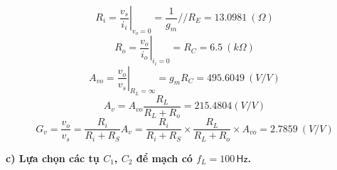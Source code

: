 \begin{equation*}
    R_{i} = \left. \frac{v_s}{i_i} \right|_{v_o=0} = \frac{1}{g_m}//R_E = 13.0981\ (\Omega)
\end{equation*}
\begin{equation*}
    R_o = \left. \frac{v_o}{i_o} \right|_{i_i=0} = R_C = 6.5\ (k\Omega)
\end{equation*}
\begin{equation*}
    A_{vo} = \left. \frac{v_o}{v_s} \right|_{R_L = \infty} = g_m R_C = 495.6049\ (V/V)
\end{equation*}
\begin{equation*}
    A_{v} = A_{vo}\dfrac{R_L}{R_L + R_o} = 215.4804 (V/V)
\end{equation*}
\begin{equation*}
    G_v = \frac{v_o}{v_s} = \frac{R_i}{R_i+R_S}A_v = \frac{R_i}{R_i+R_S}\times\frac{R_L}{R_L+R_o}\times A_{vo} = 2.7859\ (V/V)
\end{equation*}


\textbf{c) Lựa chọn các tụ $C_{1}$, $C_{2}$ để mạch có $f_{L}=100\,\textsf{Hz}$.}